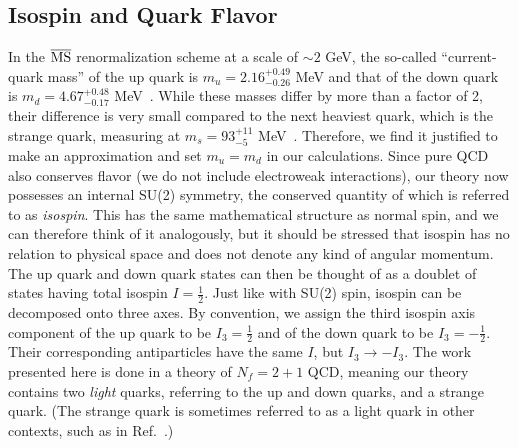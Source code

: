     \subsection{Isospin and Quark Flavor}
    In the $\overline{\rm{MS}}$ renormalization scheme at a scale of $\sim 2$ GeV, the so-called ``current-quark mass'' of the up quark is $m_u = 2.16^{+0.49}_{-0.26}$ MeV and that of the down quark is $m_d = 4.67^{+0.48}_{-0.17}$ MeV~\cite{PhysRevD.98.030001}. While these masses differ by more than a factor of 2, their difference is very small compared to the next heaviest quark, which is the strange quark, measuring at $m_s = 93^{+11}_{-5}$ MeV~\cite{PhysRevD.98.030001}. Therefore, we find it justified to make an approximation and set $m_u = m_d$ in our calculations. Since pure QCD also conserves flavor (we do not include electroweak interactions), our theory now possesses an internal SU(2) symmetry, the conserved quantity of which is referred to as \emph{isospin}. This has the same mathematical structure as normal spin, and we can therefore think of it analogously, but it should be stressed that isospin has no relation to physical space and does not denote any kind of angular momentum. The up quark and down quark states can then be thought of as a doublet of states having total isospin $I=\frac{1}{2}$. Just like with SU(2) spin, isospin can be decomposed onto three axes. By convention, we assign the third isospin axis component of the up quark to be $I_3 = \frac{1}{2}$ and of the down quark to be $I_3 = -\frac{1}{2}$. Their corresponding antiparticles have the same $I$, but $I_3\rightarrow -I_3$. The work presented here is done in a theory of $N_f = 2 + 1$ QCD, meaning our theory contains two \emph{light} quarks, referring to the up and down quarks, and a strange quark. (The strange quark is sometimes referred to as a light quark in other contexts, such as in Ref.~\cite{PhysRevD.98.030001}.)
    
